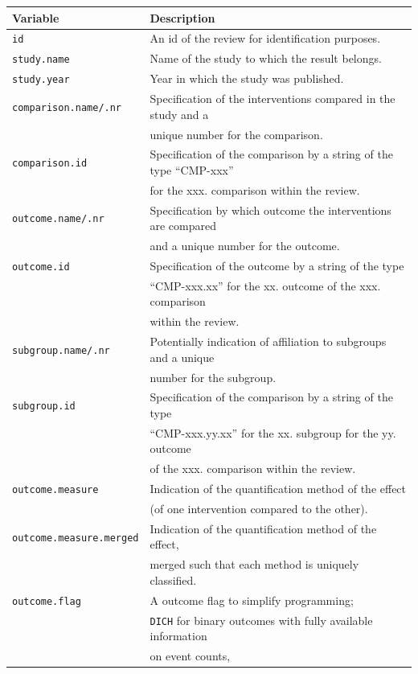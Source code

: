 \documentclass[11pt,a4paper,twoside]{book}\usepackage[]{graphicx}\usepackage[]{color}
\begin{document}
\begin{table}[ht]
  \begin{center}
    \begin{tabular}{l l}
      \textbf{Variable} & \textbf{Description}\\
      \hline
      \texttt{id} & An id of the review for identification purposes.\\
      \hline
      \texttt{study.name} & Name of the study to which the result belongs.\\
      \texttt{study.year} & Year in which the study was published.\\
      \hline
      \texttt{comparison.name/.nr} & Specification of the interventions compared in the study and a \\ &unique number for the comparison.\\
      \texttt{comparison.id} & Specification of the comparison by a string of the type ``CMP-xxx'' \\ &for the xxx. comparison within the review.\\
      \texttt{outcome.name/.nr} & Specification by which outcome the interventions are compared\\ &and a unique number for the outcome.\\
      \texttt{outcome.id} & Specification of the outcome by a string of the type \\ &``CMP-xxx.xx'' for the xx. outcome of the xxx. comparison \\ &within the review.\\
      \texttt{subgroup.name/.nr} & Potentially indication of affiliation to subgroups and a unique \\ &number for the subgroup.\\
      \texttt{subgroup.id} & Specification of the comparison by a string of the type \\ &``CMP-xxx.yy.xx'' for the xx. subgroup for the yy. outcome \\ & of the xxx. comparison within the review.\\
      \texttt{outcome.measure} & Indication of the quantification method of the effect \\ &(of one intervention compared to the other).\\
      \texttt{outcome.measure.merged} & Indication of the quantification method of the effect, \\ &merged such that each method is uniquely classified.\\
      \texttt{outcome.flag} & A outcome flag to simplify programming; \\ &\texttt{DICH} for binary outcomes with fully available information \\ &on event counts,

\end{tabular}
\end{center}
\end{table}
\end{document}
